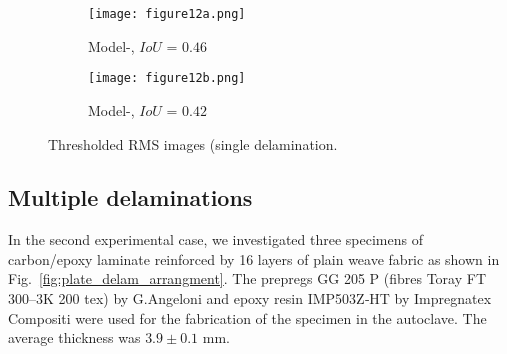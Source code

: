 \begin{figure} [!h]
	\begin{subfigure}[b]{.48\textwidth}
		\centering
		\DIFdelbeginFL %
\DIFdelendFL \DIFaddbeginFL \texttt{[image: figure12a.png]}
		\DIFaddendFL \caption{Model-, \(IoU\) = \(0.46\)}
		\label{fig:RMS_threshold_CFRP_Teflon_3o_saeed}
	\end{subfigure}
	\hfill
	\begin{subfigure}[b]{.48\textwidth}
		\centering
		\DIFdelbeginFL %
\DIFdelendFL \DIFaddbeginFL \texttt{[image: figure12b.png]}
		\DIFaddendFL \caption{Model-, \(IoU\) = \(0.42\)} 
		\label{fig:RMS_threshold_CFRP_Teflon_3o_ijjeh}
	\end{subfigure}
	\caption{Thresholded RMS images \DIFdelbeginFL {}\DIFdelendFL (\DIFaddbeginFL {}\DIFaddendFL single delamination\DIFdelbeginFL \DIFdelFL{)}\DIFdelendFL .}
	\label{fig:RMS_threshold_CFRP_Teflon_3o_images}
\end{figure} 
\clearpage
\subsection{Multiple delaminations}
In the second experimental case, we investigated three specimens of carbon/epoxy laminate reinforced by 16 layers of plain weave fabric as shown in Fig.~\ref{fig:plate_delam_arrangment}. 
\DIFaddbegin {}\DIFaddend The prepregs GG 205 P (fibres Toray FT 300–3K 200 tex) by G.\DIFaddbegin \DIFadd{~}\DIFaddend Angeloni and epoxy resin IMP503Z‐HT by Impregnatex Compositi were used for the fabrication of the specimen in the autoclave. 
The average thickness \DIFaddbegin {}\DIFaddend was \(3.9 \pm 0.1\) mm.

